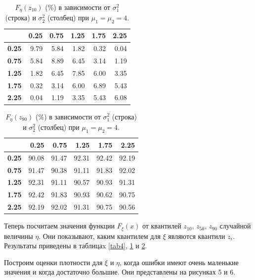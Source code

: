 \documentclass[12pt]{article}
\begin{document}
\begin{table}[!hhh]
	\centering
	\caption{$F_{\eta}(z_{10})$ ($\%$) в зависимости от $\sigma_{1}^{2}$ (строка) и $\sigma_{2}^{2}$ (столбец) при $\mu_{1} = \mu_{2} = 4$. }
	\label{tab5}
	\begin{tabular}{rrrrrr}
		\hline
		& \textbf{0.25} & \textbf{0.75} & \textbf{1.25} & \textbf{1.75} & \textbf{2.25} \\ 
		\hline
		\textbf{0.25} & 9.79 & 5.84 & 1.82 & 0.32 & 0.04 \\ 
		\textbf{0.75} & 5.84 & 8.89 & 6.45 & 3.14 & 1.19 \\ 
		\textbf{1.25} & 1.82 & 6.45 & 7.85 & 6.00 & 3.35 \\ 
		\textbf{1.75} & 0.32 & 3.14 & 6.00 & 6.89 & 5.43 \\ 
		\textbf{2.25} & 0.04 & 1.19 & 3.35 & 5.43 & 6.08 \\ 
		\hline
	\end{tabular}
\end{table}

\begin{table}[!hhh]
	\centering
	\caption{$F_{\eta}(z_{90})$ ($\%$) в зависимости от $\sigma_{1}^{2}$ (строка) и $\sigma_{2}^{2}$ (столбец) при $\mu_{1} = \mu_{2} = 4$.}
	\label{tab6}
	\begin{tabular}{rrrrrr}
		\hline
		& \textbf{0.25} & \textbf{0.75} & \textbf{1.25} & \textbf{1.75} & \textbf{2.25} \\
		\hline
		\textbf{0.25} & 90.08 & 91.47 & 92.31 & 92.42 & 92.19 \\ 
		\textbf{0.75} & 91.47 & 90.38 & 91.11 & 91.83 & 92.02 \\ 
		\textbf{1.25} & 92.31 & 91.11 & 90.57 & 90.93 & 91.31 \\ 
		\textbf{1.75} & 92.42 & 91.83 & 90.93 & 90.62 & 90.75 \\ 
		\textbf{2.25} & 92.19 & 92.02 & 91.31 & 90.75 & 90.56 \\ 
		\hline
	\end{tabular}
\end{table}	
	
	Теперь посчитаем значения функции $F_{\xi}(x)$ от квантилей $z_{10}$, $z_{50}$, $z_{90}$ случайной величины $\eta$. Они показывают, каким квантилем для $\xi$ являются квантили $z_{i}$. Результаты приведены в таблицаx \ref{tab4}, \ref{tab5} и \ref{tab6}.
	
	Построим оценки плотности для $\xi$ и $\eta$, когда ошибки имеют очень маленькие значения и когда достаточно большие. Они представлены на рисунках 5 и 6.
	
\end{document}
